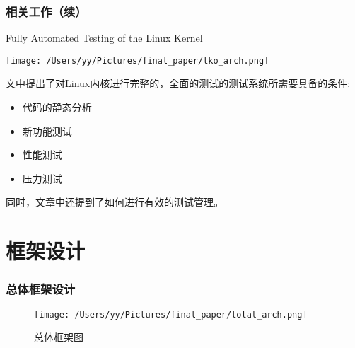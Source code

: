 \documentclass[xcolor=dvipsnames,11pt]{beamer}
\begin{document}
\begin{frame}
\frametitle{相关工作（续）}

\begin{block}{Fully Automated Testing of the Linux Kernel}

\begin{minipage}[b]{0.48\linewidth}
\texttt{[image: /Users/yy/Pictures/final\_paper/tko\_arch.png]}
\end{minipage}
\begin{minipage}[b]{0.48\linewidth}
文中提出了对Linux内核进行完整的，全面的测试的测试系统所需要具备的条件:
\begin{itemize}
\item 代码的静态分析
\item  新功能测试
\item  性能测试
\item 压力测试
\end{itemize}

同时，文章中还提到了如何进行有效的测试管理。

\end{minipage}


\end{block}

\end{frame}

\iffalse
\begin{frame}
\frametitle{相关工作（续）}

\begin{block}{Non-scalable locks are dangerous}
在文章中，作者提出了非可扩展锁的使用会在即使很短的临界区内造成整个系统的性能下降，并且通过实验重现了性能下降的场景，并建立模型分析了非可扩展锁造成性能下降的原因。
\end{block}

\begin{block}{Automated Performance Analysis of Load Tests}
作者提出了一种通过分析执行的日志并于上一次的执行结果进行比较的方法来进行负载测试，从而得出对性能负载性能的评测。
\begin{figure}[htp]
\centering
\texttt{[image: /Users/yy/Pictures/final\_paper/auto\_perf\_anlysis.png]}
\caption{自动负载性能分析}
\label{}
\end{figure}
\end{block}

\end{frame}
\fi




\section{框架设计}
\begin{frame}
\frametitle{总体框架设计}
\begin{figure}[htp]
\centering
\texttt{[image: /Users/yy/Pictures/final\_paper/total\_arch.png]}
\caption{总体框架图}
\label{}
\end{figure}
\end{frame}
\end{document}
